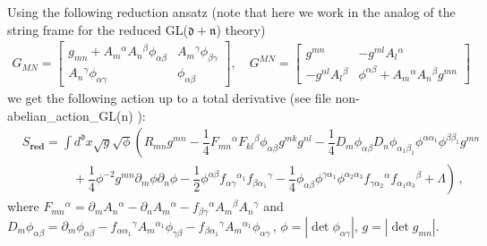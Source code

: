 \documentclass[12pt, utf8]{article}
\numberwithin{equation}{section}
\begin{document}
Using the following reduction ansatz (note that here we work in the analog of the string frame for the reduced GL($\mathfrak{d}+\mathfrak{n}$) theory)
\begin{equation}
   \begin{aligned}
      G_{M N} =  
          \begin{bmatrix}
		      g_{m n} + A_{m}{}^{\alpha} A_{n}{}^{\beta} \phi_{\alpha \beta} & A_{m}{}^{\gamma}\phi_{\beta \gamma} \\
              A_{n}{}^{\gamma} \phi_{\alpha \gamma} & \phi_{\alpha \beta} 
	     \end{bmatrix} ,   \quad
         G^{M N} =  
          \begin{bmatrix}
		      g^{m n}  & - g^{m l} A_{l}{}^{\alpha} \\
            - g^{n l} A_{l}{}^{\beta}   & \phi^{\alpha \beta}  + A_{m}{}^{\alpha} A_{n}{}^{\beta} g^{m n}
	     \end{bmatrix}
   \end{aligned}
\end{equation}
we get the following action up to a total derivative (see file non-abelian\_action\_GL(n) \cite{Gubarev:2025nonabelianuni}): 
\begin{equation} \label{reduced_action}
    \begin{aligned}
      &  S_{\textbf{red}} = \int d^{\mathfrak{d}}x \sqrt{g} \sqrt{\phi} \left( R_{m n} g^{m n} - \dfrac{1}{4} F_{m n}{}^{\alpha} F_{k l}{}^{\beta} \phi_{\alpha \beta} g^{m k} g^{n l}  - \dfrac{1}{4} D_{m} \phi_{\alpha \beta} D_{n} \phi_{\alpha_1 \beta_1} \phi^{\alpha \alpha_1} \phi^{\beta \beta_1} g^{m n}  \right. \\
        & \left. \qquad \qquad + \dfrac{1}{4} \phi^{-2} g^{m n} \partial_{m} \phi  \partial_{n} \phi - \dfrac{1}{2} \phi^{\alpha \beta} f_{\alpha \gamma}{}^{\alpha_1} f_{\beta \alpha_1}{}^{\gamma} - \dfrac{1}{4} \phi_{\alpha \beta} \phi^{\gamma \alpha_1} \phi^{\alpha_2 \alpha_3} f_{\gamma \alpha_2}{}^{\alpha} f_{\alpha_1 \alpha_3}{}^{\beta}  + \Lambda  \right) \, , 
    \end{aligned}
\end{equation}
where $ F_{m n}{}^{\alpha} = \partial_{m}{A_{n}{}^{\alpha} } -  \partial_{n}{A_{m}{}^{\alpha} } -  f_{\beta \gamma}{}^{\alpha} A_{m}{}^{\beta} A_{n}{}^{\gamma}  $ and $D_{m} \phi_{\alpha \beta} =  \partial_{m}{ \phi_{\alpha \beta }} - f_{\alpha \alpha_1}{}^{\gamma} A_{m}{}^{\alpha_1} \phi_{\gamma \beta} - f_{\beta \alpha_1}{}^{\gamma} A_{m}{}^{\alpha_1} \phi_{\alpha \gamma} \, $, $\phi = |\det \phi_{\alpha \gamma}|$, $g = |\det g_{mn}|$.
\end{document}
